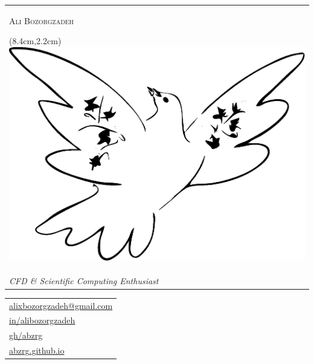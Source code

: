 \documentclass[11pt, letterpaper]{article}
\newcommand{\name}{Ali Bozorgzadeh}
\newcommand{\whoAmIShort}{CFD \& Scientific Computing Enthusiast}
\begin{document}

\begin{minipage}[t][1.25in][t]{.5\textwidth}
\begin{tabular}{@{}l@{}} %
\\
{\Huge\scshape \name}
\begin{textblock*}{\textwidth}(8.4cm,2.2cm) %
\includegraphics[width=0.35\linewidth]{./figures/Dove.eps}
\end{textblock*}
\\[2.35ex]
{\large\itshape \color{jldGray} \whoAmIShort}
\end{tabular}
\end{minipage}
\hfill
\begin{minipage}[t][1.25in][t]{.3\textwidth}
\hfill
\begin{tabular}{l@{}}
    \href{mailto://alixbozorgzadeh@gmail.com}{\color{jldGray}alixbozorgzadeh\textcolor{jldGray!50}{@gmail.com}} \\
    \href{https://linkedin.com/in/alibozorgzadeh}{\color{jldGray}\textcolor{jldGray!50}{in/}alibozorgzadeh} \\
    \href{https://github.com/abzrg}{\color{jldGray}\textcolor{jldGray!50}{gh/}abzrg} \\
    \href{https://abzrg.github.io}{\color{jldGray}abzrg\textcolor{jldGray!50}{.github.io}}
\end{tabular}
\end{minipage}

\vspace{-2ex}
\end{document}
